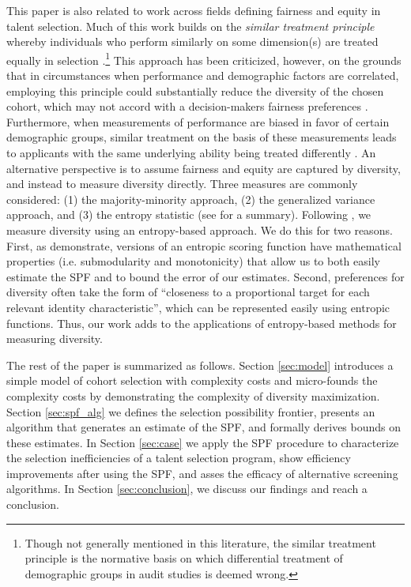 This paper is also related to work across fields defining fairness and equity in talent selection. Much of this work builds on the \emph{similar treatment principle} whereby individuals who perform similarly on some dimension(s) are treated equally in selection \cite{dwork2012fairness}.\footnote{Though not generally mentioned in this literature, the similar treatment principle is the normative basis on which differential treatment of demographic groups in audit studies is deemed wrong.} This approach has been criticized, however, on the grounds that in circumstances when performance and demographic factors are correlated, employing this principle could substantially reduce the diversity of the chosen cohort, which may not accord with a decision-makers fairness preferences \cite{fleisher2021s}. Furthermore, when measurements of performance are biased in favor of certain demographic groups, similar treatment on the basis of these measurements leads to applicants with the same underlying ability being treated differently \cite{fleisher2021s}. An alternative perspective is to assume fairness and equity are captured by diversity, and instead to measure diversity directly. Three measures are commonly considered: (1) the majority-minority approach, (2) the generalized variance approach, and (3) the entropy statistic (see  for a summary). Following , we measure diversity using an entropy-based approach. We do this for two reasons. First, as  demonstrate, versions of an entropic scoring function have mathematical properties (i.e. submodularity and monotonicity) that allow us to both easily estimate the SPF and to bound the error of our estimates. Second, preferences for diversity often take the form of ``closeness to a proportional target for each relevant identity characteristic'', which can be represented easily using entropic functions. Thus, our work adds to the applications of entropy-based methods for measuring diversity.

The rest of the paper is summarized as follows. Section \ref{sec:model} introduces a simple model of cohort selection with complexity costs and micro-founds the complexity costs by demonstrating the complexity of diversity maximization. Section \ref{sec:spf_alg} we defines the selection possibility frontier, presents an algorithm that generates an estimate of the SPF, and formally derives bounds on these estimates. In Section \ref{sec:case} we apply the SPF procedure to characterize the selection inefficiencies of a talent selection program, show efficiency improvements after using the SPF, and asses the efficacy of alternative screening algorithms. In Section \ref{sec:conclusion}, we discuss our findings and reach a conclusion. 



